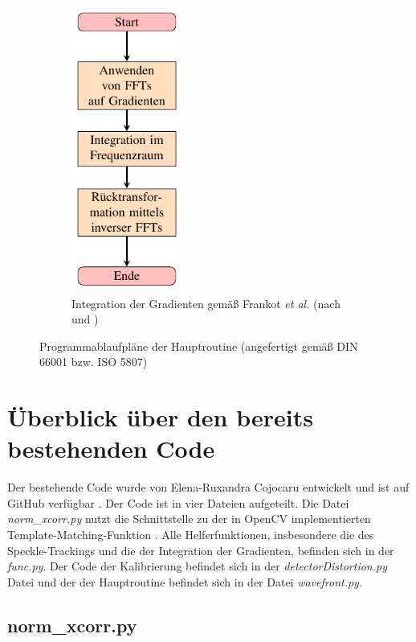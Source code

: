 \begin{figure}[htbp]
\begin{subfigure}[b]{0.45\textwidth}
		\includegraphics[width=0.4\textwidth]{pdf/graph_fc}
		\caption[Frankot-Chellappa]{Integration der Gradienten gemäß Frankot \textit{et al.} (nach \cite{FC88} und \cite{Kov04})}
		\label{fig:graph_fc}
	\end{subfigure}
	\caption[Algorithmen]{Programmablaufpläne der Hauptroutine (angefertigt gemäß DIN 66001 bzw. ISO 5807)}
\end{figure}

\section{Überblick über den bereits bestehenden Code}

Der bestehende Code wurde von Elena-Ruxandra Cojocaru entwickelt und ist auf GitHub verfügbar \cite{Coj17}. Der Code ist in vier Dateien aufgeteilt. Die Datei \textit{norm\_xcorr.py} nutzt die Schnittstelle zu der in OpenCV implementierten Template-Matching-Funktion \cite{SA17}. Alle Helferfunktionen, insbesondere die des Speckle-Trackings und die der Integration der Gradienten, befinden sich in der \textit{func.py}. Der Code der Kalibrierung befindet sich in der \textit{detectorDistortion.py} Datei und der der Hauptroutine befindet sich in der Datei \textit{wavefront.py}. 

\subsection{norm\_xcorr.py}

